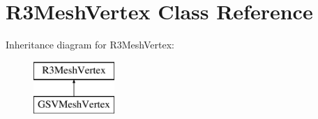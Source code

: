 \hypertarget{class_r3_mesh_vertex}{}\section{R3\+Mesh\+Vertex Class Reference}
\label{class_r3_mesh_vertex}
Inheritance diagram for R3\+Mesh\+Vertex\+:\begin{figure}[H]
\begin{center}
\leavevmode
\includegraphics[height=2.000000cm]{class_r3_mesh_vertex}
\end{center}
\end{figure}
